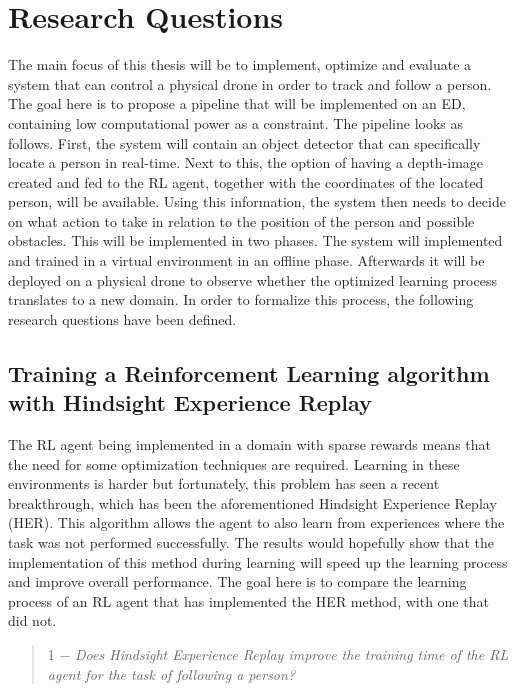 \section{Research Questions}
The main focus of this thesis will be to implement, optimize and evaluate a system 
that can control a physical drone in order to track and follow a person. The goal here is 
to propose a pipeline that will be implemented on an ED, containing low computational power as a constraint.  
The pipeline looks as follows. First, the system will contain an object 
detector that can specifically locate a person in real-time. Next to this, the option 
of having a depth-image created and fed to the RL agent, together with the coordinates 
of the located person, will be available. Using this information, the system then needs 
to decide on what action to take in relation to the position of the person and possible obstacles. 
This will be implemented in two phases. The system will implemented and trained in a virtual 
environment in an offline phase. Afterwards it will be deployed on a physical drone 
to observe whether the optimized learning process translates to a new domain. 
In order to formalize this process, the following research questions have been defined. 

\subsection{Training a Reinforcement Learning algorithm with Hindsight Experience Replay}
The RL agent being implemented in a domain with sparse rewards means that the need for 
some optimization techniques are required. Learning in these environments is harder 
but fortunately, this problem has seen a recent breakthrough, which has been the 
aforementioned Hindsight Experience Replay (HER). This algorithm allows the 
agent to also learn from experiences where the task was not performed successfully. 
The results would hopefully show that the implementation of this method during 
learning will speed up the learning process and improve overall performance. The goal
here is to compare the learning process of an RL agent that has implemented the HER 
method, with one that did not. 

\begin{quote}
    \label{research1}
    1 $-$ \textit{Does Hindsight Experience Replay improve the training time of the RL agent for the task of following a person?}
\end{quote}

